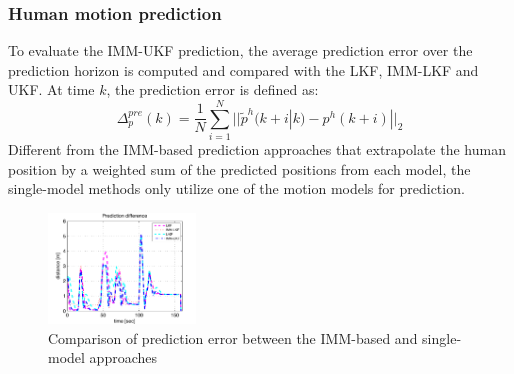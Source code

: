 \documentclass[letterpaper, 10 pt, conference]{ieeeconf}
\begin{document}
	\subsubsection{Human motion prediction}\label{subsubsec:motion_pred}
	To evaluate the IMM-UKF prediction, the average prediction error over the prediction horizon is computed and compared with the LKF, IMM-LKF and UKF. 
	At time $k$, the prediction error is defined as:
	\small	\begin{equation}
		\Delta^{pre}_p(k)=\frac{1}{N}\sum\limits_{i=1}^{N}||\tilde{p}^h(k+i|k)-p^h(k+i)||_2\label{eqn:pred_err}
	\end{equation}
	\normalsize
	Different from the IMM-based prediction approaches that extrapolate the human position by a weighted sum of the predicted positions from each model, the single-model methods only utilize one of the motion models for prediction.
	
	
	\begin{figure}
		\centering
		\includegraphics[width=0.35\textwidth]{figures/imm_vs_single}
		\caption{Comparison of prediction error between the IMM-based and single-model approaches}
		\label{fig:pred}
	\end{figure}
	
	
\end{document}
